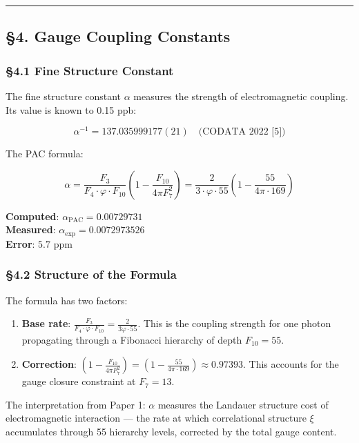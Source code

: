 \documentclass[
  11pt,
  a4paper]{article}
\begin{document}
\begin{center}\rule{0.5\linewidth}{0.5pt}\end{center}

\subsection{§4. Gauge Coupling
Constants}\label{gauge-coupling-constants}

\subsubsection{§4.1 Fine Structure
Constant}\label{fine-structure-constant}

The fine structure constant \(\alpha\) measures the strength of
electromagnetic coupling. Its value is known to 0.15 ppb:

\[\alpha^{-1} = 137.035999177(21) \quad \text{(CODATA 2022 [5])}\]

The PAC formula:

\[\alpha = \frac{F_3}{F_4 \cdot \varphi \cdot F_{10}} \left(1 - \frac{F_{10}}{4\pi F_7^2}\right) = \frac{2}{3 \cdot \varphi \cdot 55} \left(1 - \frac{55}{4\pi \cdot 169}\right)\]

\textbf{Computed}: \(\alpha_{\text{PAC}} = 0.00729731\)\\
\textbf{Measured}: \(\alpha_{\text{exp}} = 0.0072973526\)\\
\textbf{Error}: \(5.7 \text{ ppm}\)

\subsubsection{§4.2 Structure of the
Formula}\label{structure-of-the-formula}

The formula has two factors:

\begin{enumerate}
\def\labelenumi{\arabic{enumi}.}
\item
  \textbf{Base rate}:
  \(\frac{F_3}{F_4 \cdot \varphi \cdot F_{10}} = \frac{2}{3\varphi \cdot 55}\).
  This is the coupling strength for one photon propagating through a
  Fibonacci hierarchy of depth \(F_{10} = 55\).
\item
  \textbf{Correction}:
  \(\left(1 - \frac{F_{10}}{4\pi F_7^2}\right) = \left(1 - \frac{55}{4\pi \cdot 169}\right) \approx 0.97393\).
  This accounts for the gauge closure constraint at \(F_7 = 13\).
\end{enumerate}

The interpretation from Paper 1: \(\alpha\) measures the Landauer
structure cost of electromagnetic interaction --- the rate at which
correlational structure \(\xi\) accumulates through 55 hierarchy levels,
corrected by the total gauge content.
\end{document}

